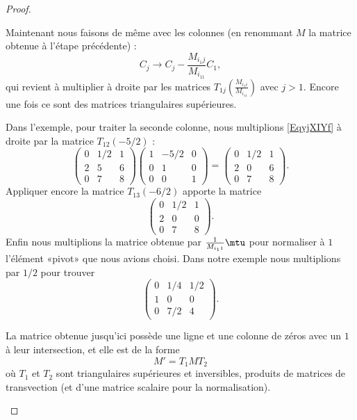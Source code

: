 \begin{proof}
\begin{subproof}
		Maintenant nous faisons de même avec les colonnes (en renommant \( M\) la matrice obtenue à l'étape précédente) :
		\begin{equation}
			C_j\to C_j-\frac{ M_{i_1j} }{ M_{i_11} }C_1,
		\end{equation}
		qui revient à multiplier à droite par les matrices \( T_{1j}(\frac{ M_{i_1i} }{ M_{i_11} })\) avec \( j>1\). Encore une fois ce sont des matrices triangulaires supérieures.

		Dans l'exemple, pour traiter la seconde colonne, nous multiplions \eqref{EqyjXIYf} à droite par la matrice \( T_{12}(-5/2)\) :
		\begin{equation}
			\begin{pmatrix}
				0 & 1/2 & 1 \\
				2 & 5   & 6 \\
				0 & 7   & 8
			\end{pmatrix}
			\begin{pmatrix}
				1 & -5/2 & 0 \\
				0 & 1    & 0 \\
				0 & 0    & 1
			\end{pmatrix}=
			\begin{pmatrix}
				0 & 1/2 & 1 \\
				2 & 0   & 6 \\
				0 & 7   & 8
			\end{pmatrix}.
		\end{equation}
		Appliquer encore la matrice \( T_{13}(-6/2)\) apporte la matrice
		\begin{equation}
			\begin{pmatrix}
				0 & 1/2 & 1 \\
				2 & 0   & 0 \\
				0 & 7   & 8
			\end{pmatrix}.
		\end{equation}
		Enfin nous multiplions la matrice obtenue par \( \frac{1}{ M_{i_11} }\mtu\) pour normaliser à \( 1\) l'élément «pivot» que nous avions choisi. Dans notre exemple nous multiplions par \( 1/2\) pour trouver
		\begin{equation}        \label{Eqduglwu}
			\begin{pmatrix}
				0 & 1/4 & 1/2 \\
				1 & 0   & 0   \\
				0 & 7/2 & 4
			\end{pmatrix}.
		\end{equation}

		La matrice obtenue jusqu'ici possède une ligne et une colonne de zéros avec un \( 1\) à leur intersection, et elle est de la forme
		\begin{equation}
			M'=T_1MT_2
		\end{equation}
		où \( T_1\) et \( T_2\) sont triangulaires supérieures et inversibles, produits de matrices de transvection (et d'une matrice scalaire pour la normalisation).


\end{subproof}
\end{proof}
